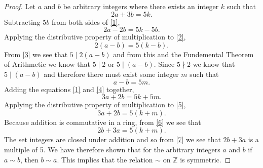 \documentclass[12pt]{article}
\begin{document}
\begin{proof}
Let $a$ and $b$ be arbitrary integers where there exists an integer $k$ such that
\begin{equation}\label{1}
2a + 3b = 5k.
\end{equation}
Subtracting $5b$ from both sides of \eqref{1},
\begin{equation}\label{2}
2a - 2b = 5k - 5b.
\end{equation}
Applying the distributive property of multiplication to \eqref{2},
\begin{equation}\label{3}
2(a-b) = 5(k-b).
\end{equation}
From \eqref{3} we see that $5\mid 2(a-b)$ and from this and the Fundemental Theorem of Arithmetic we know that $5\mid 2$ or $5\mid (a-b)$. Since $5 \nmid 2$ we know that $5\mid (a-b)$ and therefore there must exist some integer $m$ such that
\begin{equation}\label{4}
a-b=5m.
\end{equation}
Adding the equations \eqref{1} and \eqref{4} together,
\begin{equation}\label{5}
3a + 2b = 5k + 5m.
\end{equation}
Applying the distributive property of multiplication to \eqref{5},
\begin{equation}\label{6}
3a + 2b = 5(k+m).
\end{equation}
Because addition is commutative in a ring, from \eqref{6} we see that
\begin{equation}\label{7}
2b + 3a = 5(k+m).
\end{equation}
The set integers are closed under addition and so from \eqref{7} we see that $2b+3a$ is a multiple of 5. We have therefore shown that for the arbitrary integers $a$ and $b$ if $a\sim b$, then $b \sim a$. This implies that the relation $\sim$ on $\mathbb{Z}$ is symmetric.
\end{proof}
\end{document}

